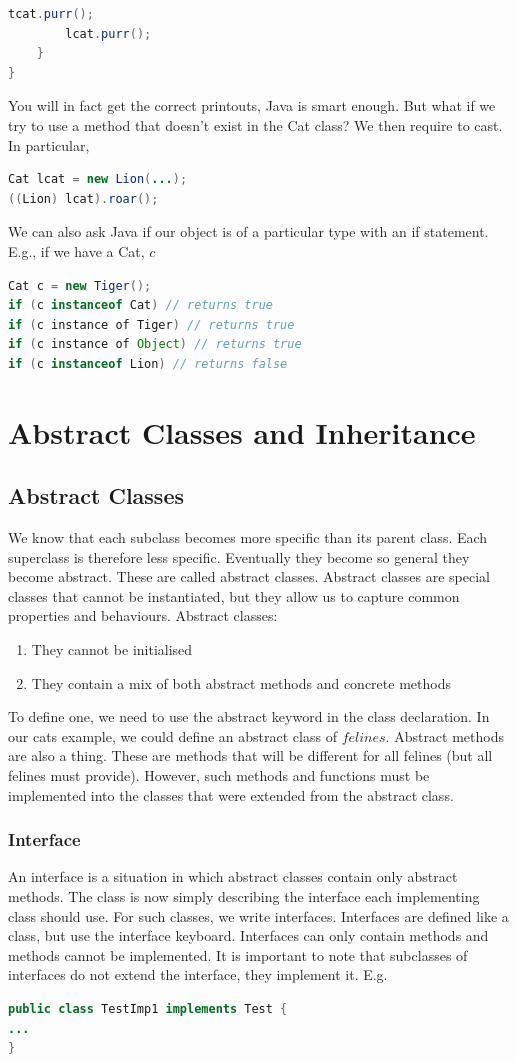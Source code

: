 \documentclass[11pt,a4 paper]{book}
\theoremstyle{plain}
\theoremstyle{definition}
\theoremstyle{remark}
\begin{document}
\begin{flushleft}
\begin{lstlisting}[language = Java]
		tcat.purr();
		lcat.purr();
	}
}
\end{lstlisting}
You will in fact get the correct printouts, Java is smart enough. But what if we try to use a method that doesn't exist in the Cat class? We then require to cast. In particular,
\begin{lstlisting}[language = Java]
Cat lcat = new Lion(...);
((Lion) lcat).roar();
\end{lstlisting}
We can also ask Java if our object is of a particular type with an if statement. E.g., if we have a Cat, $c$
\begin{lstlisting}[language = Java]
Cat c = new Tiger();
if (c instanceof Cat) // returns true
if (c instance of Tiger) // returns true
if (c instance of Object) // returns true
if (c instanceof Lion) // returns false
\end{lstlisting}
\section{Abstract Classes and Inheritance}
\subsection{Abstract Classes}
We know that each subclass becomes more specific than its parent class. Each superclass is therefore less specific. Eventually they become so general they become abstract. These are called abstract classes. Abstract classes are special classes that cannot be instantiated, but they allow us to capture common properties and behaviours. Abstract classes:
\begin{enumerate}
	\item They cannot be initialised \\
	\item They contain a mix of both abstract methods and concrete methods
\end{enumerate}
To define one, we need to use the abstract keyword in the class declaration. In our cats example, we could define an abstract class of $felines$. Abstract methods are also a thing. These are methods that will be different for all felines (but all felines must provide). However, such methods and functions must be implemented into the classes that were extended from the abstract class.
\subsubsection{Interface}
An interface is a situation in which abstract classes contain only abstract methods. The class is now simply describing the interface each implementing class should use. For such classes, we write interfaces. Interfaces are defined like a class, but use the interface keyboard. Interfaces can only contain methods and methods cannot be implemented. It is important to note that subclasses of interfaces do not extend the interface, they implement it. E.g.
\begin{lstlisting}[language = Java]
public class TestImp1 implements Test {
...
}
\end{lstlisting}

\end{flushleft}
\end{document}
